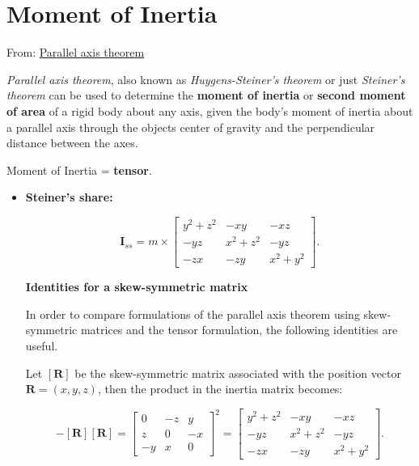 \section{Moment of Inertia}

From: \href{https://en.wikipedia.org/wiki/Parallel_axis_theorem}{Parallel axis theorem}

\textit{Parallel axis theorem}, also known as \textit{Huygens-Steiner's theorem}
or just \textit{Steiner's theorem} can be used to determine the \textbf{moment of inertia}
or \textbf{second moment of area} of a rigid body about any axis, given the body's
moment of inertia about a parallel axis through the objects center of gravity
and the perpendicular distance between the axes.

Moment of Inertia = \textbf{tensor}.

\begin{itemize}
    \item \textbf{Steiner's share:}

        \begin{equation}
            \mathbf{I}_{ss} = m \times \begin{bmatrix}
                y^{2} + z^{2} & -xy & -xz \\
                -yz & x^{2} + z^{2} & -yz \\
                -zx & -zy & x^{2} + y^{2}
            \end{bmatrix}
        .\end{equation}

        \textbf{Identities for a skew-symmetric matrix}

        In order to compare formulations of the parallel axis theorem using
        skew-symmetric matrices and the tensor formulation, the following
        identities are useful.

        Let $[\mathbf{R}]$ be the skew-symmetric matrix associated with the
        position vector $\mathbf{R} = (x, y, z)$, then the product in
        the inertia matrix becomes:

        \begin{equation}
            -[\mathbf{R}][\mathbf{R}] = \begin{bmatrix}
                0 & -z & y \\
                z & 0 & -x \\
                -y & x & 0
            \end{bmatrix}^{2}
            = \begin{bmatrix}
                y^{2} + z^{2} & -xy & -xz \\
                -yz & x^{2} + z^{2} & -yz \\
                -zx & -zy & x^{2} + y^{2}
            \end{bmatrix}
        .\end{equation}


\end{itemize}
